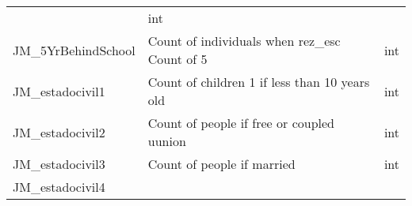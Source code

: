 \documentclass[11pt]{article}
\begin{document}
\begin{longtable}[]{@{}lll@{}}
\begin{minipage}[t]{0.12\columnwidth}
\end{minipage} & \begin{minipage}[t]{0.16\columnwidth}\raggedright\strut
int\strut
\end{minipage}\tabularnewline
\begin{minipage}[t]{0.63\columnwidth}\raggedright\strut
JM\_5YrBehindSchool\strut
\end{minipage} & \begin{minipage}[t]{0.12\columnwidth}\raggedright\strut
Count of individuals when rez\_esc Count of 5\strut
\end{minipage} & \begin{minipage}[t]{0.16\columnwidth}\raggedright\strut
int\strut
\end{minipage}\tabularnewline
\begin{minipage}[t]{0.63\columnwidth}\raggedright\strut
JM\_estadocivil1\strut
\end{minipage} & \begin{minipage}[t]{0.12\columnwidth}\raggedright\strut
Count of children 1 if less than 10 years old\strut
\end{minipage} & \begin{minipage}[t]{0.16\columnwidth}\raggedright\strut
int\strut
\end{minipage}\tabularnewline
\begin{minipage}[t]{0.63\columnwidth}\raggedright\strut
JM\_estadocivil2\strut
\end{minipage} & \begin{minipage}[t]{0.12\columnwidth}\raggedright\strut
Count of people if free or coupled uunion\strut
\end{minipage} & \begin{minipage}[t]{0.16\columnwidth}\raggedright\strut
int\strut
\end{minipage}\tabularnewline
\begin{minipage}[t]{0.63\columnwidth}\raggedright\strut
JM\_estadocivil3\strut
\end{minipage} & \begin{minipage}[t]{0.12\columnwidth}\raggedright\strut
Count of people if married\strut
\end{minipage} & \begin{minipage}[t]{0.16\columnwidth}\raggedright\strut
int\strut
\end{minipage}\tabularnewline
\begin{minipage}[t]{0.63\columnwidth}\raggedright\strut
JM\_estadocivil4\strut
\end{minipage} & \begin{minipage}[t]{0.12\columnwidth}\raggedright\strut

\end{minipage}
\end{longtable}
\end{document}
